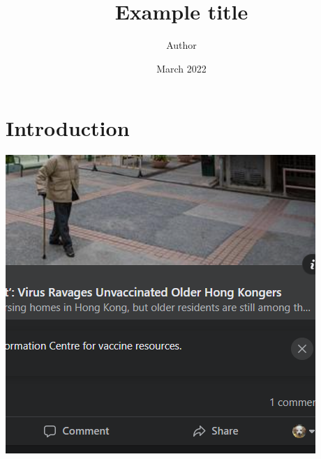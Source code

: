 \documentclass{article}
\title{Example title}
\author{Author}
\date{March 2022}
\begin{document}
\maketitle

\section{Introduction}

\includegraphics[scale=1]{xqMmh}
\end{document}
